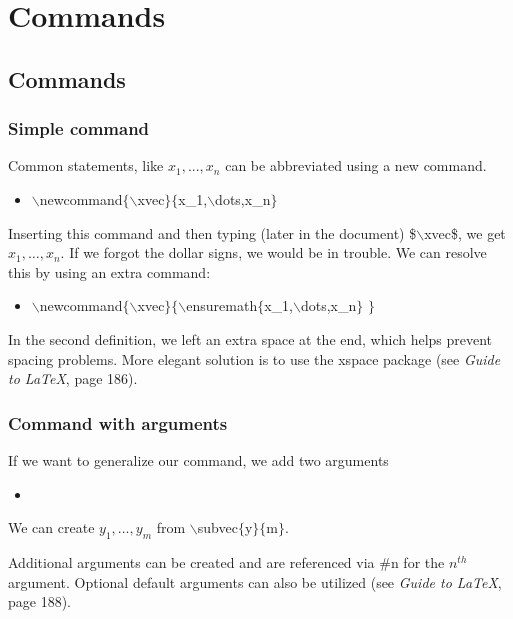 \section[Commands]{Commands}
\subsection[Commands]{Commands}

\begin{frame}  \frametitle{Simple command}
	\newcommand{\xvec}{x_1, \ldots, x_n}
	Common statements, like $x_1, ..., x_n$ can be abbreviated using a new command.
	\begin{itemize}
		\item[] {\color{command}$\backslash$newcommand\color{braces}$\{${\color{command}$\backslash$xvec}$\}\{${\color{black}x\_1,{\color{command}$\backslash$dots},x\_n}$\}$}
	\end{itemize}
	Inserting this command and then typing (later in the document) {\color{braces}\$\color{command}$\backslash$xvec\color{braces}\$}, we get $\xvec$. If we forgot the dollar signs, we would be in trouble. We can resolve this by using an extra command:
	\begin{itemize}
		\item[] {\color{command}$\backslash$newcommand\color{braces}$\{${\color{command}$\backslash$xvec}$\}\{${\color{command}$\backslash$ensuremath{\color{braces}$\{$}{\color{black}x\_1,{\color{command}$\backslash$dots},x\_n}}$\}$ $\}$}
	\end{itemize}
	In the second definition, we left an extra space at the end, which helps prevent spacing problems. More elegant solution is to use the {\color{highlight}xspace} package (see \textit{Guide to LaTeX}, page 186).
\end{frame}

\newcommand{\subvec}[2]{\ensuremath{#1_{1}, \ldots, #1_{#2}} }
\begin{frame}  \frametitle{Command with arguments}
	If we want to generalize our command, we add two arguments
	\begin{itemize}
		\item[] 
	\end{itemize}
	We can create \subvec{y}{m} from {\color{command}$\backslash$subvec\color{braces}$\{${\color{black}y}$\}\{${\color{black}m}$\}$}.
	
	\vspace{7mm}
	
	Additional arguments can be created and are referenced via \#n for the $n^{th}$ argument. Optional default arguments can also be utilized (see \textit{Guide to LaTeX}, page 188).
\end{frame}

